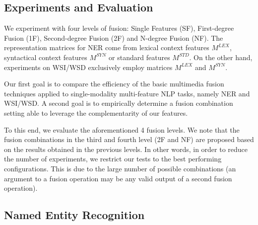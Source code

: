 



\subsection{Experiments and Evaluation}
\label{chap6:expes}

We experiment with four levels of fusion: Single Features (SF), First-degree Fusion (1F), Second-degree Fusion (2F) and N-degree Fusion (NF). The representation matrices for NER come from lexical context features $M^{LEX}$, syntactical context features $M^{SYN}$ or standard features $M^{STD}$.  On the other hand, experiments on WSI/WSD exclusively employ matrices $M^{LEX}$ and $M^{SYN}$.

Our first goal is to compare the efficiency of the basic multimedia fusion techniques applied to  single-modality multi-feature NLP tasks, namely NER and WSI/WSD. A second goal is to empirically determine a fusion combination setting able to leverage the complementarity of our features.

To this end, we evaluate the aforementioned 4 fusion levels. We note that the fusion combinations in the third and fourth level (2F and NF) are proposed based on the results obtained in the previous levels. In other words, in order to reduce the number of experiments, we restrict our tests to the best performing configurations. This is due to the large number of possible combinations (an argument to a fusion operation may be any valid output of a second fusion operation).


\subsection{Named Entity Recognition}

